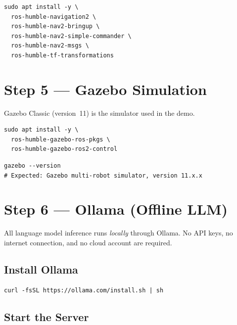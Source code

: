 \documentclass[12pt,a4paper]{report}
\begin{document}
\begin{lstlisting}[style=bashstyle, caption={Install Nav2 packages}]
sudo apt install -y \
  ros-humble-navigation2 \
  ros-humble-nav2-bringup \
  ros-humble-nav2-simple-commander \
  ros-humble-nav2-msgs \
  ros-humble-tf-transformations
\end{lstlisting}

\section{Step 5 --- Gazebo Simulation}

Gazebo Classic (version~11) is the simulator used in the demo.

\begin{lstlisting}[style=bashstyle, caption={Install Gazebo packages}]
sudo apt install -y \
  ros-humble-gazebo-ros-pkgs \
  ros-humble-gazebo-ros2-control
\end{lstlisting}

\begin{lstlisting}[style=bashstyle, caption={Verify Gazebo}]
gazebo --version
# Expected: Gazebo multi-robot simulator, version 11.x.x
\end{lstlisting}

\section{Step 6 --- Ollama (Offline LLM)}

All language model inference runs \emph{locally} through Ollama.
No API keys, no internet connection, and no cloud account are required.

\subsection{Install Ollama}

\begin{lstlisting}[style=bashstyle, caption={Install Ollama}]
curl -fsSL https://ollama.com/install.sh | sh
\end{lstlisting}

\subsection{Start the Server}
\end{document}
